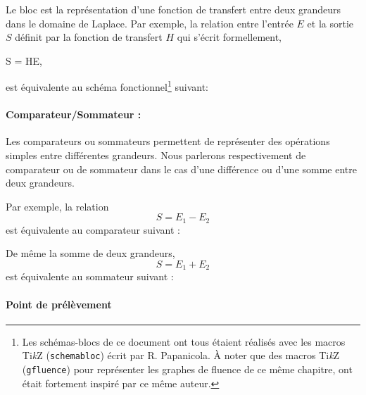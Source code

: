 Le bloc est la représentation d'une fonction de transfert entre deux 
grandeurs dans le domaine de Laplace. Par exemple, la relation entre l'entrée 
$E$ et la sortie $S$ définit par la fonction de transfert $H$ qui s'écrit 
formellement, 
\begin{bequation}
S = HE,\label{eq-ES}
\end{bequation}
est équivalente au schéma fonctionnel\footnote{Les schémas-blocs de ce document
ont tous étaient réalisés avec les macros Ti\emph{k}Z (\verb?schemabloc?) 
écrit par R. Papanicola\cite{schemabloc}. \`A noter que des macros 
Ti\emph{k}Z (\verb?gfluence?) pour représenter les graphes de fluence 
de ce même chapitre, ont était fortement inspiré par ce même auteur.} 
suivant:

\begin{center}

\end{center}

\paragraph{Comparateur/Sommateur :}

Les comparateurs ou sommateurs permettent de représenter des opérations 
simples entre différentes grandeurs.
Nous parlerons respectivement de comparateur ou de sommateur dans le cas 
d'une différence ou d'une somme entre deux grandeurs. 


Par exemple, la relation 
$$
S = E_1-E_2 
$$
est équivalente au comparateur suivant :
\begin{center}

\end{center}

De même la somme de deux grandeurs,
$$
S = E_1+E_2
$$
est équivalente au sommateur suivant :
\begin{center}

\end{center}

\paragraph{Point de prélèvement}

